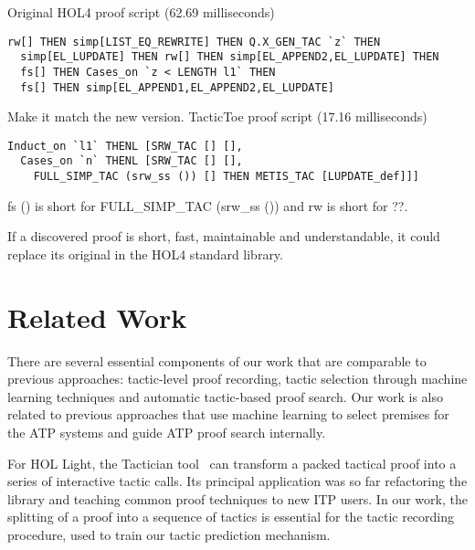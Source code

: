 \documentclass[runningheads,a4paper,draft]{svjour3}
\def\holfour{\textsf{HOL4}\xspace}
\def\hollight{\textsf{HOL Light}\xspace}
\def\tactictoe{\textsf{TacticToe}\xspace}
\begin{document}
\vspace{5mm}

Original \holfour proof script (62.69 milliseconds)
\begin{lstlisting}[language=SMLSmall,frame=tb]
  rw[] THEN simp[LIST_EQ_REWRITE] THEN Q.X_GEN_TAC `z` THEN
  simp[EL_LUPDATE] THEN rw[] THEN simp[EL_APPEND2,EL_LUPDATE] THEN
  fs[] THEN Cases_on `z < LENGTH l1` THEN
  fs[] THEN simp[EL_APPEND1,EL_APPEND2,EL_LUPDATE]
\end{lstlisting}


\vspace{5mm}
Make it match the new version.
\tactictoe proof script (17.16 milliseconds)
\begin{lstlisting}[language=SMLSmall,frame=tb]
Induct_on `l1` THENL [SRW_TAC [] [],
  Cases_on `n` THENL [SRW_TAC [] [],
    FULL_SIMP_TAC (srw_ss ()) [] THEN METIS_TAC [LUPDATE_def]]]
\end{lstlisting}
fs () is short for FULL\_SIMP\_TAC (srw\_ss ()) and rw is short for ??.



If a discovered proof is short, fast, maintainable and 
understandable, it could replace its original in the \holfour standard library.


\section{Related Work}
There are several essential components of our work that are comparable to 
previous approaches: tactic-level proof recording, tactic 
selection through machine learning techniques and automatic tactic-based proof 
search. Our work is also related to previous approaches that use machine 
learning to select premises for the ATP systems and guide ATP proof search 
internally.

For \hollight, the Tactician tool~\cite{DBLP:conf/sefm/Adams15} 
can transform a packed tactical proof into a series of interactive tactic 
calls. Its principal application 
was so far refactoring the library and teaching common proof techniques to new 
ITP users. In our work, the splitting of a proof into a sequence of tactics is 
essential for the
tactic recording procedure, used to train our tactic prediction mechanism.
\end{document}
